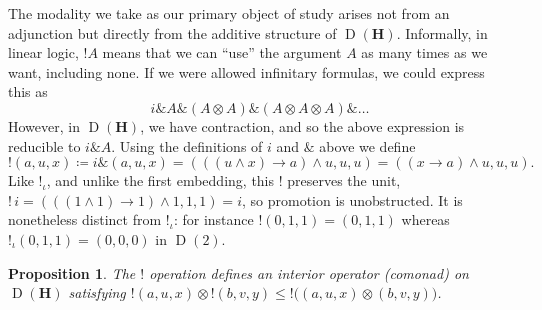 \documentclass[reqno]{amsart}
\theoremstyle{plain}
\newtheorem{prop}[thm]{Proposition}
\theoremstyle{definition}
\DeclareMathOperator{\D}{D}
\newcommand{\cf}[1]{\mathbf{#1}}
\DeclareMathOperator{\Amp}{\&}
\begin{document}
The modality we take as our primary object of study arises not from an adjunction but directly from the additive structure of $ \D(\cf{H}) $. Informally, in linear logic, $!A$ means that we can ``use'' the argument $A$ as many times as we want, including none. If we were allowed infinitary formulas, we could express this as
\begin{equation*}
    i \Amp A \Amp (A \otimes A) \Amp (A \otimes A \otimes A) \Amp \ldots
\end{equation*}
However, in $ \D(\cf{H}) $, we have contraction, and so the above expression is reducible to $ i \Amp A $. Using the definitions of $i$ and $\Amp$ above we define
\begin{equation*}
    !(a,u,x) \coloneqq i \Amp (a,u,x) = (((u \wedge x) \rightarrow a) \wedge u, u, u) = ((x \rightarrow a) \wedge u,u,u).
\end{equation*}
Like $ {!}_{\iota} $, and unlike the first embedding, this $ ! $ preserves the unit, $ {!}\,i = (((1 \wedge 1) \rightarrow 1) \wedge 1, 1, 1) = i $, so promotion is unobstructed. It is nonetheless distinct from $ {!}_{\iota} $: for instance $ !(0,1,1) = (0,1,1) $ whereas $ {!}_{\iota}(0,1,1) = (0,0,0) $ in $ \D(2) $.
\begin{prop}\label{prop: bang}
    The $!$ operation defines an interior operator (comonad) on $\D(\cf{H}) $ satisfying $ !(a,u,x) \otimes {!(b,v,y)} \leq {!((a,u,x)} \otimes (b,v,y)) $.
\end{prop}
\end{document}

